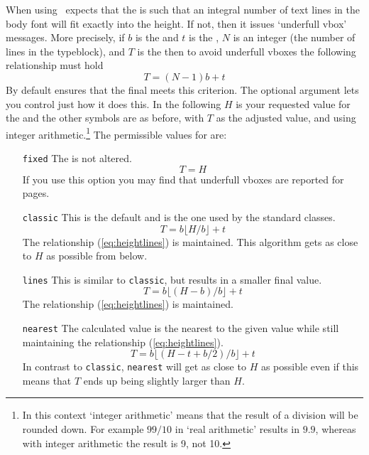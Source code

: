    When using \cmd{\flushbottom} \ltx\ expects that the \lnc{\textheight} 
is such that an integral number of text lines in the body font will fit
exactly into the height. If not, then it issues `underfull vbox' messages.
More precisely, if  $b$ is the \lnc{\baselineskip} and $t$ is the 
\lnc{\topskip}, $N$ is an integer (the number of lines in the typeblock), 
and $T$ is the
\lnc{\textheight} then to avoid underfull vboxes the following relationship
must hold
\begin{equation}
T = (N-1)b + t \label{eq:heightlines}
\end{equation}
By default \cmd{\checkthelayout} ensures that the final \lnc{\textheight} 
meets this criterion. The optional  argument lets you control
just how it does this. In the following $H$ is your requested value for
the \lnc{\textheight} and the other symbols are as before, with $T$ as
the adjusted value, and using integer arithmetic.\footnote{In this context 
`integer arithmetic' means that the result of a division will be rounded down.
For example $99/10$ in `real arithmetic' results in $9.9$, whereas with
integer arithmetic the result is 9, not 10.}
The permissible values for  are:
\begin{itemize}
\item[\texttt{fixed}] The \lnc{\textheight} is not altered. 
\begin{equation} T = H \end{equation}
If you use this option you may find that underfull vboxes are reported
for \cmd{\flushbottom} pages.
\item[\texttt{classic}] This is the default and is the one used by the standard
classes. 
\begin{equation} T = b \lfloor H/b \rfloor + t \end{equation}
The relationship (\ref{eq:heightlines}) is maintained. This algorithm
gets as close to $H$ as possible from below.
\item[\texttt{lines}] This is similar to \texttt{classic}, but results in a 
smaller final value.
\begin{equation} T = b \lfloor (H-b)/b \rfloor + t \end{equation}
The relationship (\ref{eq:heightlines}) is maintained.
\item[\texttt{nearest}] The calculated value is the nearest to the given value
while still maintaining the relationship (\ref{eq:heightlines}).
\begin{equation} 
  T = b \lfloor (H - t + b/2)/b \rfloor +  t 
\end{equation} 
In contrast to \texttt{classic}, \texttt{nearest}
will get as close to $H$ as possible even if this means that $T$ ends
up being slightly larger than $H$.
\end{itemize}

